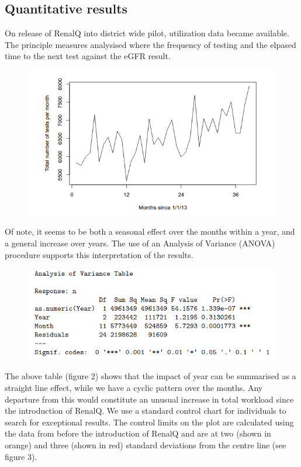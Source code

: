 \documentclass[11pt]{article}
\begin{document}
\subsection{Quantitative results}
On release of RenalQ into district wide pilot, utilization data became available. The principle measures analysised where the frequency of testing and the elpased time to the next test against the eGFR result.\\

\begin{figure}[htp]
\centering
\includegraphics[scale=0.50]{Fig1.png}
\caption{}
\label{}
\end{figure}

Of note, it seems to be both a seasonal effect over the months within a year, and a general increase over years.  The use of an Analysis of Variance (ANOVA) procedure supports this interpretation of the results.\\

\begin{figure}[htp]
\centering
\includegraphics[scale=0.50]{fig2.png}
\caption{}
\label{}
\end{figure}

The above table (figure 2) shows that the impact of year can be summarised as a straight line effect, while we have a cyclic pattern over the months. Any departure from this would constitute an unusual increase in total workload since the introduction of RenalQ. We use a standard control chart for individuals to search for exceptional results. The control limits on the plot are calculated using the data from before the introduction of RenalQ and are at two (shown in orange) and three (shown in red) standard deviations from the centre line (see figure 3).\\
\end{document}
